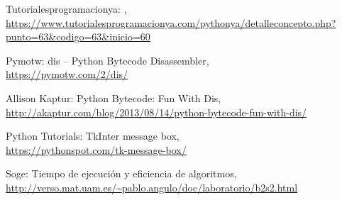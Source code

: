 \documentclass[a4paper,12pt,twoside]{memoir}
\begin{document}
\begin{thebibliography}{8}
Tutorialesprogramacionya: ,
\\\url{https://www.tutorialesprogramacionya.com/pythonya/detalleconcepto.php?punto=63&codigo=63&inicio=60}

Pymotw: dis – Python Bytecode Disassembler,
\\\url{https://pymotw.com/2/dis/}

Allison Kaptur: Python Bytecode: Fun With Dis,
\\\url{http://akaptur.com/blog/2013/08/14/python-bytecode-fun-with-dis/}

Python Tutorials: TkInter message box,
\\\url{https://pythonspot.com/tk-message-box/}

Soge: Tiempo de ejecución y eficiencia de algoritmos,
\\\url{http://verso.mat.uam.es/~pablo.angulo/doc/laboratorio/b2s2.html}

\end{thebibliography}
\end{document}
